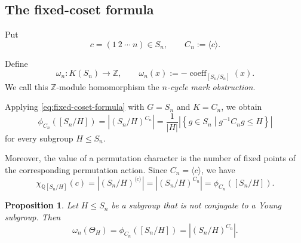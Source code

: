 \documentclass[a4paper,11pt]{article}
\numberwithin{equation}{section}
\newtheorem{proposition}[theorem]{Proposition}
\newcommand{\Q}{\mathbb{Q}}
\newcommand{\Z}{\mathbb{Z}}
\newcommand{\coeff}{\operatorname{coeff}}
\begin{document}
\subsection{The fixed-coset formula}
\label{subsec:fixed-coset-formula}

Put
\[
  c=(1\ 2\ \cdots\ n)\in S_n,
  \qquad
  C_n:=\langle c\rangle.
\]

Define
\begin{equation}\label{eq:omega-definition}
  \omega_n:K(S_n)\longrightarrow\Z,
  \qquad
  \omega_n(x):=-\coeff_{[S_n/S_n]}(x).
\end{equation}
We call this $\Z$-module homomorphism the
\emph{$n$-cycle mark obstruction}.

Applying \eqref{eq:fixed-coset-formula} with $G=S_n$ and $K=C_n$, we obtain
\[
  \phi_{C_n}([S_n/H])
  =
  |(S_n/H)^{C_n}|
  =
  \frac{1}{|H|}
  \left|
    \left\{
      g\in S_n
      \mathrel{}\middle|\mathrel{}
      g^{-1}C_ng\le H
    \right\}
  \right|
\]
for every subgroup $H\le S_n$.

Moreover, the value of a permutation character is the number of fixed points
of the corresponding permutation action. Since $C_n=\langle c\rangle$, we have
\begin{equation}\label{eq:permutation-character-fixed-points}
  \chi_{\Q[S_n/H]}(c)
  =
  |(S_n/H)^{\langle c\rangle}|
  =
  |(S_n/H)^{C_n}|
  =
  \phi_{C_n}([S_n/H]).
\end{equation}

\begin{proposition}\label{prop:fixed-coset}
Let $H\le S_n$ be a subgroup that is not conjugate to a Young subgroup. Then
\[
  \omega_n(\Theta_H)
  =
  \phi_{C_n}([S_n/H])
  =
  |(S_n/H)^{C_n}|.
\]
\end{proposition}
\end{document}
